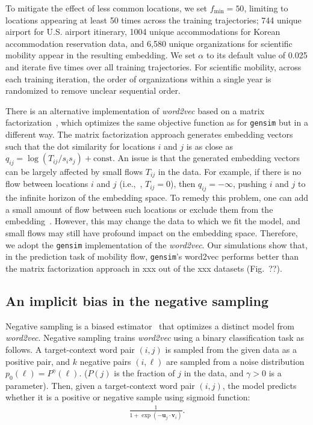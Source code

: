 \documentclass[12pt]{article} %
\def\ie{i.e.,~}
\begin{document}
To mitigate the effect of less common locations, we set $f_{\min} = 50$, limiting to locations appearing at least 50 times across the training trajectories;
744 unique airport for U.S. airport itinerary, 1004 unique accommodations for Korean accommodation reservation data, and 6,580 unique organizations for scientific mobility appear in the resulting embedding.
We set $\alpha$ to its default value of 0.025 and iterate five times over all training trajectories.
For scientific mobility, across each training iteration, the order of organizations within a single year is randomized to remove unclear sequential order.

There is an alternative implementation of \textit{word2vec} based on a matrix factorization~\autocite{levy2014neural,Qiu2018}, which optimizes the same objective function as for \texttt{gensim} but in a different way.
The matrix factorization approach generates embedding vectors such that the dot similarity for locations $i$ and $j$ is as close as $q_{ij}= \log(T_{ij} / s_i s_j) + \text{const}$.
An issue is that the generated embedding vectors can be largely affected by small flows $T_{ij}$ in the data.
For example, if there is no flow between locations $i$ and $j$ (\ie, $T_{ij} = 0$), then $q_{ij} = -\infty$, pushing $i$ and $j$ to the infinite horizon of the embedding space.
To remedy this problem, one can add a small amount of flow between such locations or exclude them from the embedding~\autocite{levy2014neural,Qiu2018}.
However, this may change the data to which we fit the model, and small flows may still have profound impact on the embedding space.
Therefore, we adopt the \texttt{gensim} implementation of the \textit{word2vec}.
Our simulations show that, in the prediction task of mobility flow, \texttt{gensim}'s word2vec performs better than the matrix factorization approach in xxx out of the xxx datasets (Fig.~??).


\subsection*{An implicit bias in the negative sampling}
\label{sec:sg_and_word2vec}

Negative sampling is a biased estimator~\autocite{Chia2010,Dyer2014} that optimizes a distinct model  from {\it word2vec}.
Negative sampling trains {\it word2vec} using a binary classification task as follows.
A target-context word pair $(i,j)$ is sampled from the given data as a positive pair, and $k$ negative pairs $(i,\ell)$ are sampled from a noise distribution $p_0(\ell)=P^\gamma(\ell)$. ($P(j)$ is the fraction of $j$ in the data, and $\gamma>0$ is a parameter).
Then, given a target-context word pair $(i,j)$, the model predicts whether it is a positive or negative sample using sigmoid function:
\begin{align}
	\label{eq:sigmoid}
	\frac{1}{1 + \exp\left( - \bm{u}_j \cdot \bm{v}_i \right)}.
\end{align}
\end{document}
